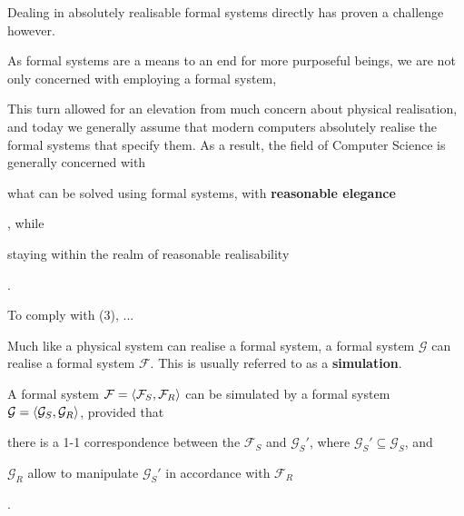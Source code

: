 Dealing in absolutely realisable formal systems directly has proven a challenge
however.

As formal systems are a means to an end for more purposeful beings, we are not
only concerned with employing a formal system, 

This turn allowed for an elevation from much concern about physical
realisation, and today we generally assume that modern computers absolutely
realise the formal systems that specify them. As a result, the field of
Computer Science is generally concerned with\begin{inparaenum}[(1)]\item what
can be solved using formal systems, with \textbf{reasonable elegance} \item,
while \item staying within the realm of reasonable
realisability\end{inparaenum}.

To comply with (3), ... 

Much like a physical system can realise a formal system, a formal system
$\mathcal{G}$ can realise a formal system $\mathcal{F}$. This is usually
referred to as a \textbf{simulation}.

\begin{definition}

A formal system $\mathcal{F}=\left\langle{\mathcal{F}_S,\mathcal{F}_R}\right\rangle$ can be
simulated by a formal system $\mathcal{G}=\left\langle{\mathcal{G}_S,\mathcal{G}_R}\right\rangle$,
provided that\begin{inparaenum}[(1)]\item there is a 1-1 correspondence between
the $\mathcal{F}_S$ and $\mathcal{G}_S'$, where
$\mathcal{G}_S'\subseteq\mathcal{G}_S$, and \item $\mathcal{G}_R$ allow to
manipulate $\mathcal{G}_S'$ in accordance with $\mathcal{F}_R$\end{inparaenum}.

\end{definition}





